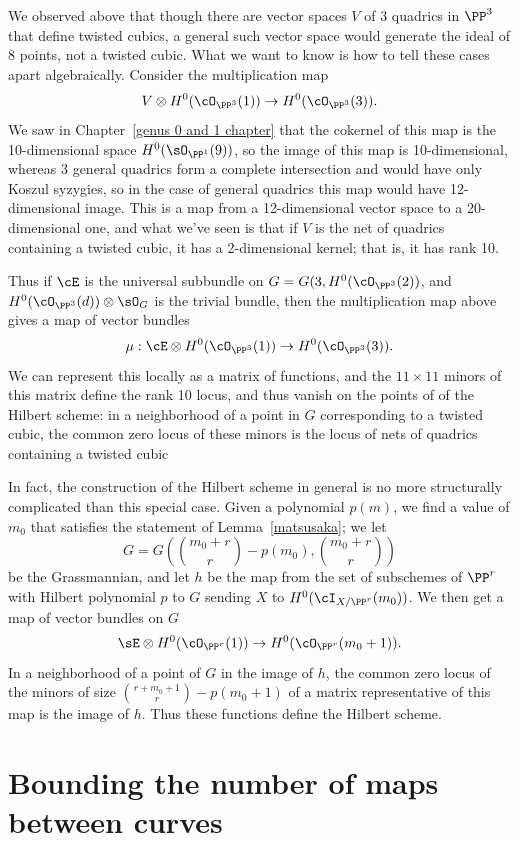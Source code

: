 We observed above that though there are vector spaces $V$ of 3 quadrics in $\PP^{3}$ that define
twisted cubics, a general such vector space  would generate the ideal of
8 points,  not a twisted cubic. What we want to know is how to tell these cases apart algebraically. Consider the multiplication map
$$
V \otimes H^0(\cO_{\PP^3}(1)) \to H^0(\cO_{\PP^3}(3)).
$$
We saw in Chapter~\ref{genus 0 and 1 chapter} that the cokernel of this map is the 10-dimensional space $H^0(\sO_{\PP^1}(9))$, so the image of this map is 10-dimensional, whereas
3 general quadrics form a complete intersection and would have only Koszul syzygies, so
in the case of general quadrics this map would have 12-dimensional image.
This is a map from a 12-dimensional vector space to a 20-dimensional one, and what we've seen is that if $V$ is the net of quadrics containing a twisted cubic, it has a 2-dimensional kernel; that is, it has rank 10. 

Thus if $\cE$ is the universal subbundle on $G = G(3, H^0(\cO_{\PP^3}(2))$, and  $H^0(\cO_{\PP^3}(d))\otimes \sO_G$ is the trivial bundle, then the multiplication map above gives a map of vector bundles
$$
\mu: \cE \otimes H^0(\cO_{\PP^3}(1)) \to H^0(\cO_{\PP^3}(3)).
$$
We can represent this locally as a matrix of functions, and the $11\times 11$ minors of this matrix
define the rank 10 locus, and thus vanish on the points of
of the Hilbert scheme: in a neighborhood of a point in $G$ corresponding to a twisted cubic, the common zero locus of these minors is the locus of nets of quadrics containing a twisted cubic


In fact, the construction of the Hilbert scheme in general is no more structurally complicated than this special case. Given a polynomial $p(m)$, we find a value of $m_0$ that satisfies the statement of Lemma~\ref{matsusaka}; we let
$$
G = G\left(\binom{m_0+r}{r} - p(m_0), \binom{m_0+r}{r} \right)
$$
be the Grassmannian, and let $h$ be the map from the set of subschemes of $\PP^r$ with Hilbert polynomial $p$ to $G$ sending $X$ to $H^0(\cI_{X/\PP^r}(m_0))$. We then get a map of vector bundles  on $G$
$$
\sE \otimes H^0(\cO_{\PP^r}(1)) \to H^0(\cO_{\PP^r}(m_0+1)).
$$
In a neighborhood of a point of $G$ in the image of $h$, the common zero locus of the minors of size $\binom{r+m_0+1}{r} - p(m_0+1)$ of a matrix representative of this map is the image of $h$. Thus these functions define the Hilbert scheme.

\section{Bounding the number of maps between curves}\label{maps between curves}

